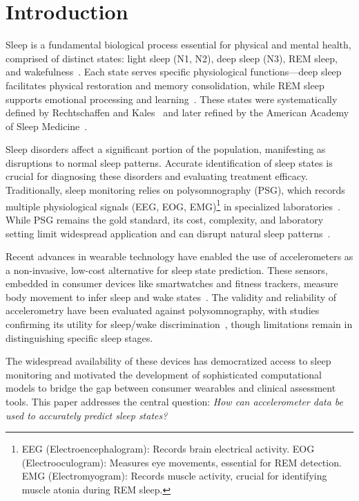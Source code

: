 \documentclass[conference]{IEEEtran}
\begin{document}
\section{Introduction}

Sleep is a fundamental biological process essential for physical and mental health, comprised of distinct states: light sleep (N1, N2), deep sleep (N3), REM sleep, and wakefulness~\cite{carskadon2005normal, diekelmann2010sleep}. Each state serves specific physiological functions—deep sleep facilitates physical restoration and memory consolidation, while REM sleep supports emotional processing and learning~\cite{diekelmann2010sleep}. These states were systematically defined by Rechtschaffen and Kales~\cite{rechtschaffen1968} and later refined by the American Academy of Sleep Medicine~\cite{aasm2007}.

Sleep disorders affect a significant portion of the population, manifesting as disruptions to normal sleep patterns. Accurate identification of sleep states is crucial for diagnosing these disorders and evaluating treatment efficacy. Traditionally, sleep monitoring relies on polysomnography (PSG), which records multiple physiological signals (EEG, EOG, EMG)\footnote{EEG (Electroencephalogram): Records brain electrical activity. EOG (Electrooculogram): Measures eye movements, essential for REM detection. EMG (Electromyogram): Records muscle activity, crucial for identifying muscle atonia during REM sleep.} in specialized laboratories~\cite{aasm2007}. While PSG remains the gold standard, its cost, complexity, and laboratory setting limit widespread application and can disrupt natural sleep patterns~\cite{pmc5781106}.

Recent advances in wearable technology have enabled the use of accelerometers as a non-invasive, low-cost alternative for sleep state prediction. These sensors, embedded in consumer devices like smartwatches and fitness trackers, measure body movement to infer sleep and wake states~\cite{pmc4883440, sadeh2011}. The validity and reliability of accelerometry have been evaluated against polysomnography, with studies confirming its utility for sleep/wake discrimination~\cite{littner2003, kushida2001}, though limitations remain in distinguishing specific sleep stages.

The widespread availability of these devices has democratized access to sleep monitoring and motivated the development of sophisticated computational models to bridge the gap between consumer wearables and clinical assessment tools. This paper addresses the central question: \textit{How can accelerometer data be used to accurately predict sleep states?}
\end{document}
